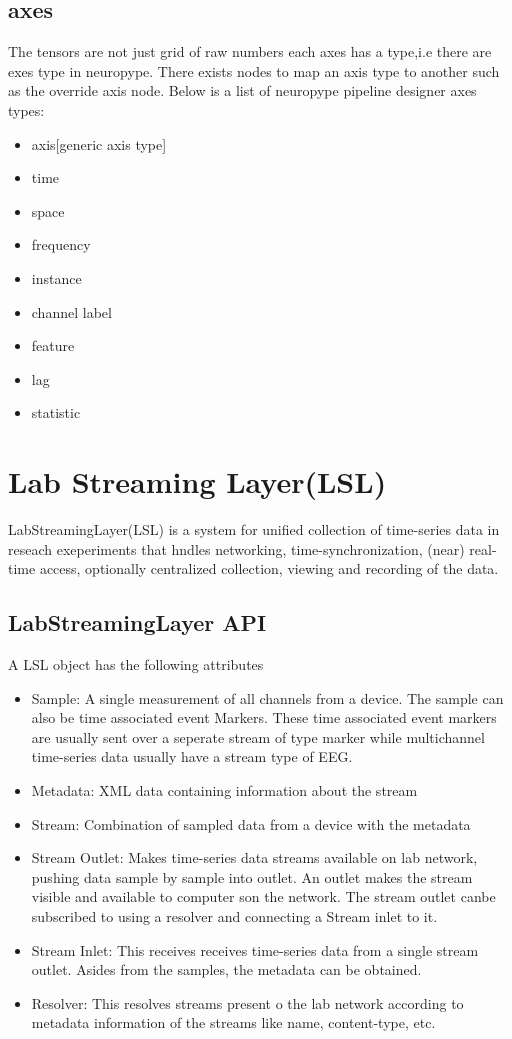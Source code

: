 \documentclass[16pt]{book}
\begin{document}
\section{axes}
\par\noindent The tensors are not just grid of raw numbers each axes has a type,i.e there are exes type in neuropype.
There exists nodes to map an axis type to another such as the override axis node.
Below is a list of neuropype pipeline designer axes types:
\begin{itemize}
    \item axis[generic axis type]
    \item time
    \item space
    \item frequency
    \item instance
    \item channel label
    \item feature
    \item lag
    \item statistic
\end{itemize}

\chapter{Lab Streaming Layer(LSL)}
\par\noindent LabStreamingLayer(LSL) is a system for unified collection of time-series data in reseach exeperiments that hndles networking, time-synchronization, (near) real-time access,
optionally centralized collection, viewing and recording of the data. 
\section{LabStreamingLayer API}
A LSL object has the following attributes
\begin{itemize}
    \item Sample: A single measurement of all channels from a device. The sample can also be time associated event Markers. These time associated event markers are 
    usually sent over a seperate stream of type marker while multichannel time-series data usually have a stream type of EEG.
    \item Metadata: XML data containing information about the stream
    \item Stream: Combination of sampled data from a device with the metadata
    \item Stream Outlet: Makes time-series data streams available on lab network, pushing data sample by sample into outlet.
    An outlet makes the stream visible and available to computer son the network. The stream outlet canbe subscribed to
    using a resolver and connecting a Stream inlet to it.
    \item Stream Inlet: This receives receives time-series data from a single stream outlet. Asides from the samples, the metadata can be obtained.
    \item Resolver: This resolves streams present o the lab network according to metadata information of the streams like name, content-type, etc.
\end{itemize}
\end{document}

